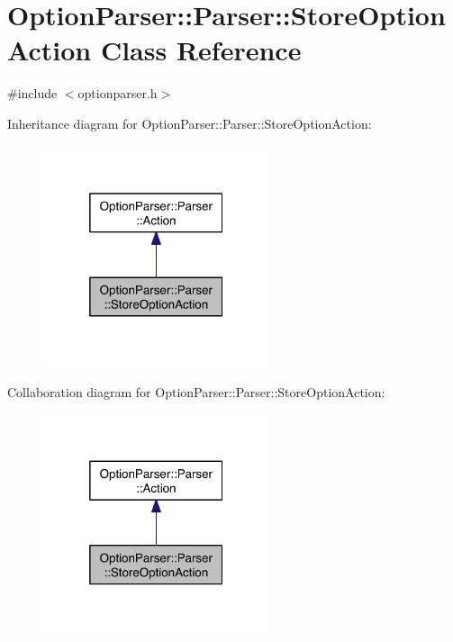 \hypertarget{class_option_parser_1_1_parser_1_1_store_option_action}{\section{Option\-Parser\-:\-:Parser\-:\-:Store\-Option\-Action Class Reference}
\label{class_option_parser_1_1_parser_1_1_store_option_action}
}


{\ttfamily \#include $<$optionparser.\-h$>$}



Inheritance diagram for Option\-Parser\-:\-:Parser\-:\-:Store\-Option\-Action\-:\nopagebreak
\begin{figure}[H]
\begin{center}
\leavevmode
\includegraphics[width=188pt]{class_option_parser_1_1_parser_1_1_store_option_action__inherit__graph}
\end{center}
\end{figure}


Collaboration diagram for Option\-Parser\-:\-:Parser\-:\-:Store\-Option\-Action\-:\nopagebreak
\begin{figure}[H]
\begin{center}
\leavevmode
\includegraphics[width=188pt]{class_option_parser_1_1_parser_1_1_store_option_action__coll__graph}
\end{center}
\end{figure}
